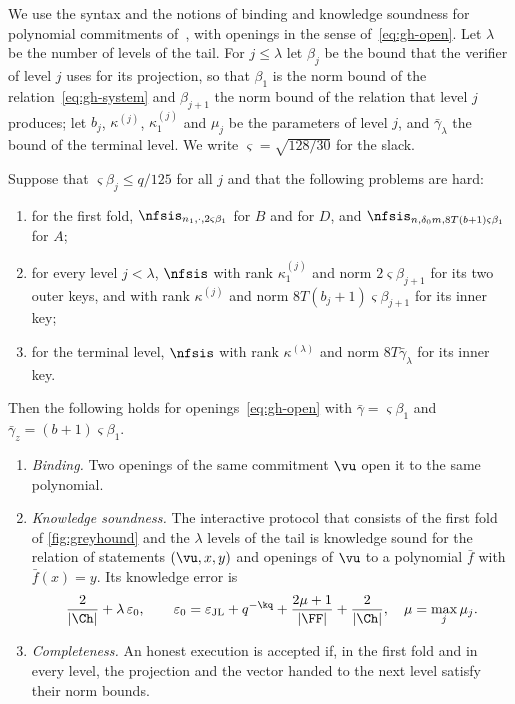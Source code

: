 We use the syntax and the notions of binding and knowledge soundness for polynomial commitments of~\cite{NS24}, with openings in the sense of~\eqref{eq:gh-open}. Let $\lambda$ be the number of levels of the tail. For $j\le\lambda$ let $\beta_j$ be the bound that the verifier of level $j$ uses for its projection, so that $\beta_1$ is the norm bound of the relation~\eqref{eq:gh-system} and $\beta_{j+1}$ the norm bound of the relation that level $j$ produces; let $b_j$, $\kappa^{(j)}$, $\kappa_1^{(j)}$ and $\mu_j$ be the parameters of level $j$, and $\bar\gamma_\lambda$ the bound of the terminal level. We write $\varsigma=\sqrt{128/30}$ for the slack.

\begin{theorem}\label{thm:pcs}
Suppose that $\varsigma\beta_j\le q/125$ for all $j$ and that the following problems are hard:
\begin{enumerate}[label=(\arabic*)]
\item for the first fold, $\nfsis_{n_1,\cdot,2\varsigma\beta_1}$ for $B$ and for $D$, and $\nfsis_{n,\delta_0m,8T(b+1)\varsigma\beta_1}$ for $A$;
\item for every level $j<\lambda$, $\nfsis$ with rank $\kappa_1^{(j)}$ and norm $2\varsigma\beta_{j+1}$ for its two outer keys, and with rank $\kappa^{(j)}$ and norm $8T(b_j+1)\varsigma\beta_{j+1}$ for its inner key;
\item for the terminal level, $\nfsis$ with rank $\kappa^{(\lambda)}$ and norm $8T\bar\gamma_\lambda$ for its inner key.
\end{enumerate}
Then the following holds for openings~\eqref{eq:gh-open} with $\bar\gamma=\varsigma\beta_1$ and $\bar\gamma_z=(b+1)\varsigma\beta_1$.
\begin{enumerate}[label=(\alph*)]
\item \emph{Binding.} Two openings of the same commitment $\vu$ open it to the same polynomial.
\item \emph{Knowledge soundness.} The interactive protocol that consists of the first fold of \cref{fig:greyhound} and the $\lambda$ levels of the tail is knowledge sound for the relation of statements $(\vu,x,y)$ and openings of $\vu$ to a polynomial $\bar f$ with $\bar f(x)=y$. Its knowledge error is
\[
\frac{2}{\lvert\Ch\rvert}+\lambda\,\varepsilon_0,\qquad\varepsilon_0=\varepsilon_{\mathrm{JL}}+q^{-\kq}+\frac{2\mu+1}{\lvert\FF\rvert}+\frac2{\lvert\Ch\rvert},\quad\mu=\max_j\mu_j .
\]
\item \emph{Completeness.} An honest execution is accepted if, in the first fold and in every level, the projection and the vector handed to the next level satisfy their norm bounds.
\end{enumerate}
\end{theorem}
